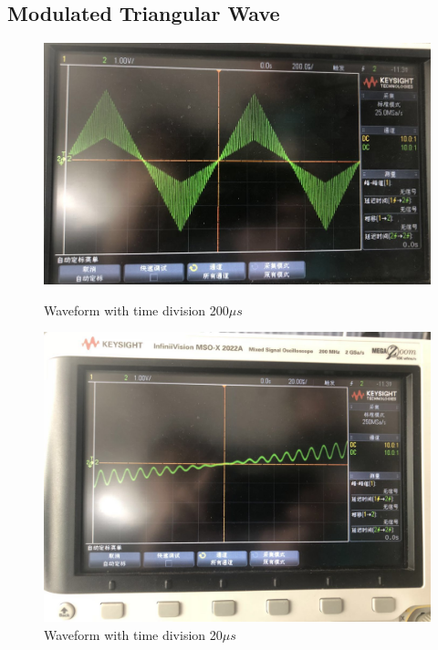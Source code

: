 \documentclass[12pt]{article}
\begin{document}
\subsection{Modulated Triangular Wave}
\begin{figure}[H]
\centering
\includegraphics[scale=0.5]{P14.jpg}
\caption{Waveform with time division 200$\mu s$}
\includegraphics[scale=0.25]{P15.jpg}
\caption{Waveform with time division 20$\mu s$}
\end{figure}
\end{document}
